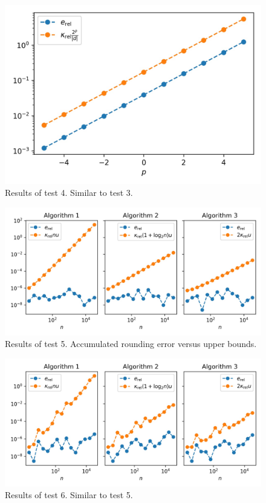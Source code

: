 \documentclass[12pt]{article}
\theoremstyle{definition}
\begin{document}
\begin{figure}[H]
\centering
\includegraphics{test4.jpeg}
\caption{Results of test 4. Similar to test 3.}
\label{test4}
\end{figure}

\begin{figure}[H]
\centering
\includegraphics{test5.jpeg}
\caption{Results of test 5. Accumulated rounding error versus upper bounds.}
\label{test5}
\end{figure}

\begin{figure}[H]
\centering
\includegraphics{test6.jpeg}
\caption{Results of test 6. Similar to test 5.}
\label{test6}
\end{figure}
\end{document}
